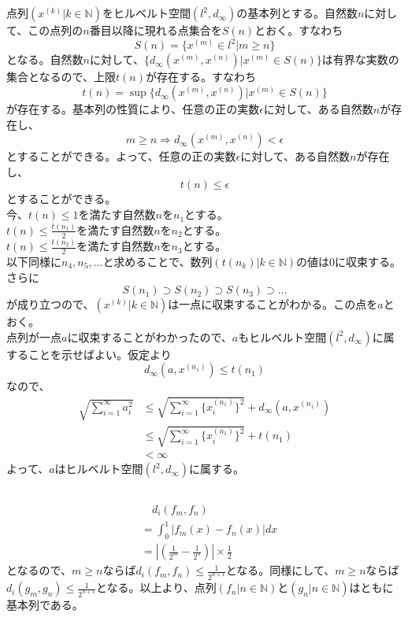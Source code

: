 \documentclass{jsarticle}
\begin{document}
\subsection{}
点列$(x^{(k)}|k\in\mathbb{N})$をヒルベルト空間$(l^2,d_\infty)$の基本列とする。自然数$n$に対して、この点列の$n$番目以降に現れる点集合を$S(n)$とおく。すなわち
\[S(n)=\{x^{(m)}\in l^2|m\geq n\}\]
となる。自然数$n$に対して、$\{d_\infty(x^{(m)},x^{(n)})|x^{(m)}\in S(n)\}$は有界な実数の集合となるので、上限$t(n)$が存在する。すなわち
\[t(n)=\sup \{d_\infty(x^{(m)},x^{(n)})|x^{(m)}\in S(n)\}\]
が存在する。基本列の性質により、任意の正の実数$\epsilon$に対して、ある自然数$n$が存在し、
\[m\geq n\Longrightarrow d_{\infty}(x^{(m)},x^{(n)})<\epsilon\]
とすることができる。よって、任意の正の実数$\epsilon$に対して、ある自然数$n$が存在し、
\[t(n)\leq\epsilon\]
とすることができる。\\
今、$t(n)\leq 1$を満たす自然数$n$を$n_1$とする。\\
$t(n)\leq\frac{t(n_1)}{2}$を満たす自然数$n$を$n_2$とする。\\
$t(n)\leq\frac{t(n_2)}{2}$を満たす自然数$n$を$n_3$とする。\\
以下同様に$n_4,n_5,...$と求めることで、数列$(t(n_k)|k\in\mathbb{N})$の値は$0$に収束する。さらに
\[S(n_1)\supset S(n_2)\supset S(n_3)\supset ...\]
が成り立つので、$(x^{(k)}|k\in\mathbb{N})$は一点に収束することがわかる。この点を$a$とおく。\\
点列が一点$a$に収束することがわかったので、$a$もヒルベルト空間$(l^2,d_\infty)$に属することを示せばよい。仮定より
\[d_\infty(a,x^{(n_1)})\leq t(n_1)\]
なので、
\begin{align*}
\sqrt{\sum_{i=1}^\infty a_i^2}&\leq\sqrt{\sum_{i=1}^\infty \{x_i^{(n_1)}\}^2}+d_\infty(a,x^{(n_1)})\\
&\leq \sqrt{\sum_{i=1}^\infty \{x_i^{(n_1)}\}^2} + t(n_1)\\
&<\infty
\end{align*}
よって、$a$はヒルベルト空間$(l^2,d_\infty)$に属する。


\subsection{}
\subsubsection{}
\begin{align*}
&\quad d_i(f_m,f_n)\\
&=\int_0^1 |f_m(x)-f_n(x)| dx\\
&=|(\frac{1}{2^m}-\frac{1}{2^n})|\times\frac{1}{2}
\end{align*}
となるので、$m\geq n$ならば$d_i(f_m,f_n)\leq \frac{1}{2^{n+1}}$となる。同様にして、$m\geq n$ならば$d_i(g_m,g_n)\leq \frac{1}{2^{n+1}}$となる。以上より、点列$(f_n|n\in\mathbb{N})$と$(g_n|n\in\mathbb{N})$はともに基本列である。
\end{document}

